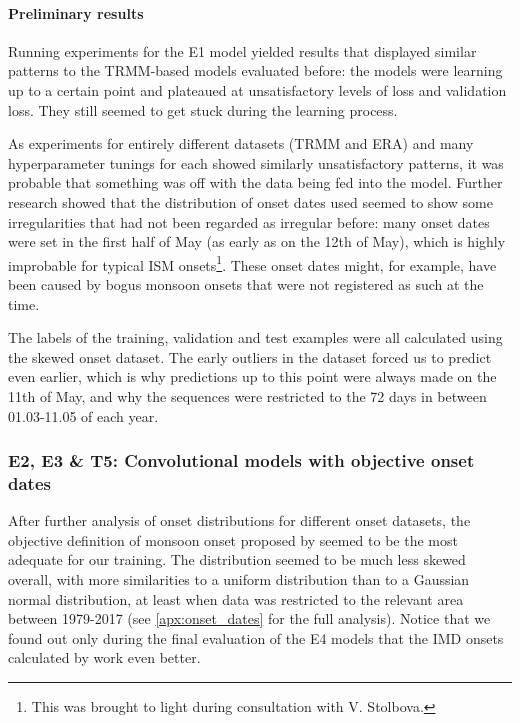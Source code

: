 \paragraph{Preliminary results}
\label{ssst:nn_e1_results}
Running experiments for the E1 model yielded results that displayed similar patterns to the TRMM-based models evaluated before: the models were learning up to a certain point and plateaued at unsatisfactory levels of loss and validation loss. They still seemed to get stuck during the learning process.

As experiments for entirely different datasets (TRMM and ERA) and many hyperparameter tunings for each showed similarly unsatisfactory patterns, it was probable that something was off with the data being fed into the model. Further research showed that the distribution of onset dates used seemed to show some irregularities that had not been regarded as irregular before: many onset dates were set in the first half of May (as early as on the 12th of May), which is highly improbable for typical ISM onsets\footnote{This was brought to light during consultation with V. Stolbova.}. These onset dates might, for example, have been caused by bogus monsoon onsets that were not registered as such at the time.

The labels of the training, validation and test examples were all calculated using the skewed onset dataset. The early outliers in the dataset forced us to predict even earlier, which is why predictions up to this point were always made on the 11th of May, and why the sequences were restricted to the 72 days in between 01.03-11.05 of each year.

\subsubsection{E2, E3 \& T5: Convolutional models with objective onset dates}
\label{sst:nn_e2t5}
After further analysis of onset distributions for different onset datasets, the objective definition of monsoon onset proposed by \citet{Singh.2009} seemed to be the most adequate for our training. The distribution seemed to be much less skewed overall, with more similarities to a uniform distribution than to a Gaussian normal distribution, at least when data was restricted to the relevant area between 1979-2017 (see \cref{apx:onset_dates} for the full analysis). Notice that we found out only during the final evaluation of the E4 models that the IMD onsets calculated by \citet{Singh.2009} work even better.

